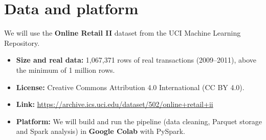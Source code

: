 \documentclass[11pt,a4paper]{article}
\begin{document}
\section{Data and platform}
We will use the \textbf{Online Retail II} dataset from the UCI Machine Learning Repository.
\begin{itemize}
  \item \textbf{Size and real data:} 1,067,371 rows of real transactions (2009--2011), above the minimum of 1 million rows.
  \item \textbf{License:} Creative Commons Attribution 4.0 International (CC BY 4.0).
  \item \textbf{Link:} \url{https://archive.ics.uci.edu/dataset/502/online+retail+ii}
  \item \textbf{Platform:} We will build and run the pipeline (data cleaning, Parquet storage and Spark analysis) in \textbf{Google Colab} with PySpark.
\end{itemize}

\end{document}
